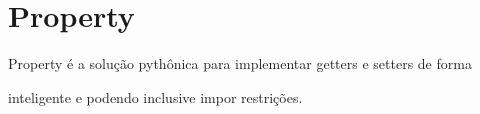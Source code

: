 \documentclass[letterpaper,10pt,brazil]{sphinxmanual}
\begin{document}
\begin{sphinxVerbatim}[commandchars=\\\{\}]
\end{sphinxVerbatim}


\section{Property}
\label{\detokenize{content/property:property}}
\begin{DUlineblock}{0em}
\item[]
\begin{DUlineblock}{\DUlineblockindent}
\item[] Property é a solução pythônica para implementar getters e setters de forma
\end{DUlineblock}
\item[] inteligente e podendo inclusive impor restrições.
\end{DUlineblock}
\end{document}
